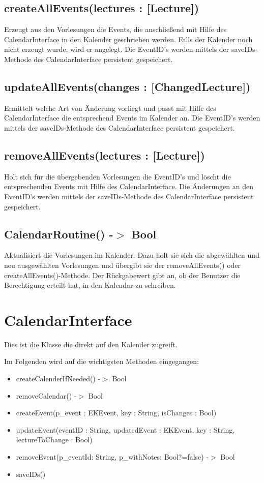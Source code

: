 \subsection[createAllEvents]{createAllEvents(lectures : [Lecture])}
Erzeugt aus den Vorlesungen die Events, die anschließend mit Hilfe des CalendarInterface in den Kalender geschrieben werden.
Falls der Kalender noch nicht erzeugt wurde, wird er angelegt.
Die EventID's werden mittels der saveIDs-Methode des CalendarInterface persistent gespeichert.

\subsection[updateAllEvents]{updateAllEvents(changes : [ChangedLecture])}
Ermittelt welche Art von Änderung vorliegt und passt mit Hilfe des CalendarInterface die  entsprechend Events im Kalender an.
Die EventID's werden mittels der saveIDs-Methode des CalendarInterface persistent gespeichert.

\subsection[removeAllEvents]{removeAllEvents(lectures : [Lecture])}
Holt sich für die übergebenden Vorlesungen die EventID's und löscht die entsprechenden Events mit Hilfe des CalendarInterface.
Die Änderungen an den EventID's werden mittels der saveIDs-Methode des CalendarInterface persistent gespeichert.

\subsection[CalendarRoutine]{CalendarRoutine() -$>$ Bool}
Aktualisiert die Vorlesungen im Kalender. Dazu holt sie sich die abgewählten und neu ausgewählten Vorlesungen und übergibt sie der removeAllEvents() oder createAllEvents()-Methode. Der Rückgabewert gibt an, ob der Benutzer die Berechtigung erteilt hat, in den Kalendar zu schreiben.

\newpage
\section{CalendarInterface}
Dies ist die Klasse die direkt auf den Kalender zugreift. 

Im Folgenden wird auf die wichtigsten Methoden eingegangen:
\begin{itemize}
     \item createCalenderIfNeeded() -$>$ Bool
     \item removeCalendar() -$>$ Bool
     \item createEvent(p\_event : EKEvent, key : String, isChanges : Bool)
     \item updateEvent(eventID : String, updatedEvent : EKEvent, key : String, lectureToChange : Bool)
     \item removeEvent(p\_eventId: String, p\_withNotes: Bool?=false) -$>$ Bool
     \item saveIDs()
\end{itemize}

